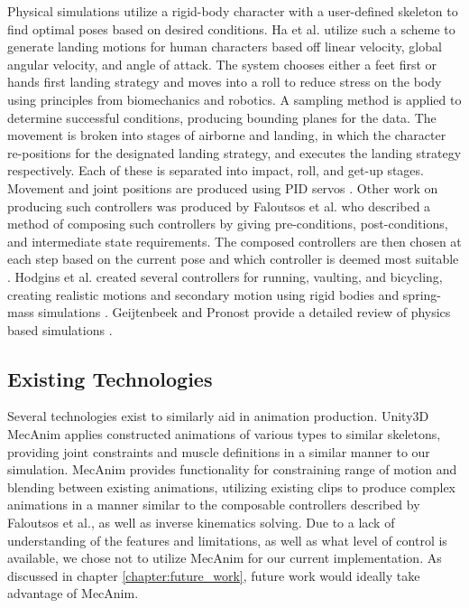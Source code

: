 		
Physical simulations utilize a rigid-body character with a user-defined skeleton to find optimal poses based on desired conditions.  Ha et al. utilize such a scheme to generate landing motions for human characters based off linear velocity, global angular velocity, and angle of attack.  The system chooses either a feet first or hands first landing strategy and moves into a roll to reduce stress on the body using principles from biomechanics and robotics.  A sampling method is applied to determine successful conditions, producing bounding planes for the data.  The movement is broken into stages of airborne and landing, in which the character re-positions for the designated landing strategy, and executes the landing strategy respectively. Each of these is separated into impact, roll, and get-up stages.  Movement and joint positions are produced using PID servos \cite{falling_landing}.  Other work on producing such controllers was produced by Faloutsos et al. who described a method of composing such controllers by giving pre-conditions, post-conditions, and intermediate state requirements.  The composed controllers are then chosen at each step based on the current pose and which controller is deemed most suitable \cite{composable_controllers}.  Hodgins et al. created several controllers for running, vaulting, and bicycling, creating realistic motions and secondary motion using rigid bodies and spring-mass simulations \cite{anim_human_athletics}.  Geijtenbeek and Pronost provide a detailed review of physics based simulations \cite{inter_physics_anim}.

\subsection{Existing Technologies}
Several technologies exist to similarly aid in animation production. Unity3D MecAnim applies constructed animations of various types to similar skeletons, providing joint constraints and muscle definitions in a similar manner to our simulation.  MecAnim provides functionality for constraining range of motion and blending between existing animations, utilizing existing clips to produce complex animations in a manner similar to the composable controllers described by Faloutsos et al., as well as inverse kinematics solving.  Due to a lack of understanding of the features and limitations, as well as what level of control is available, we chose not to utilize MecAnim for our current implementation.  As discussed in chapter \ref{chapter:future_work}, future work would ideally take advantage of MecAnim.

